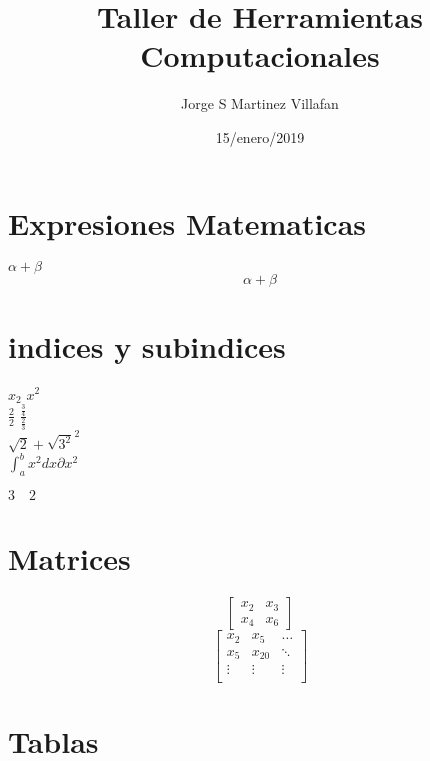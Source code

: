 \documentclass[letterpaper, 12pt, oneside]{article}%
\title{\Huge Taller de Herramientas Computacionales}
\author{Jorge S Martinez Villafan}
\date{15/enero/2019}
\begin{document}
	\maketitle
	\begin{center}
	
	\end{center}
\newpage
\section*{Expresiones Matematicas}
$\alpha + \beta$ \\ %
\[\alpha + \beta\]

\section*{indices y subindices}
$x_{2}$
$x^{2}$ \\
$\frac{2}{2}$
$\frac{\frac{3}{4}}{\frac{2}{3}}$\\

$\sqrt{2} + \sqrt{3^2}^2$\\

$\int_{a}^{b}x^2 dx \partial x^2$

$3 \quad 2$

\section * {Matrices}

\[
\begin{bmatrix}
	x_{2} & x_{3}\\
	x_{4} & x_{6}
\end{bmatrix}
\]
\[
\begin{bmatrix}	
x_{2} & x_{5} & \dots\\
x_{5} & x_{20} & \ddots\\
\vdots & \vdots & \vdots\\ 

 
\end{bmatrix}
\]
\section{Tablas}
\end{document}
